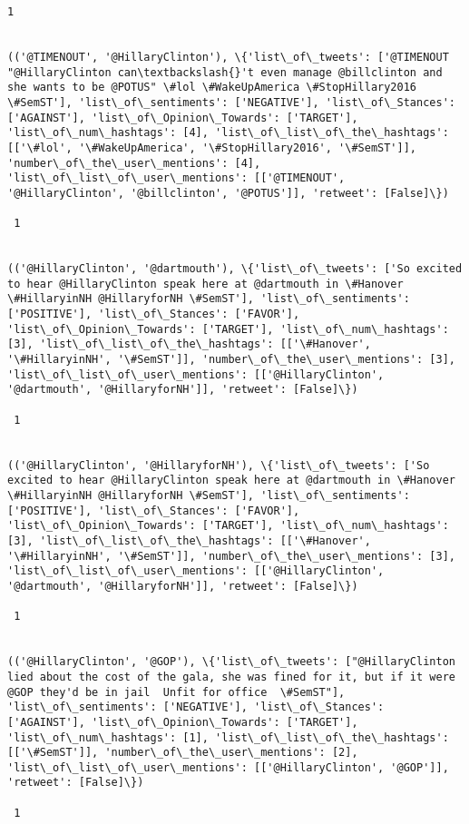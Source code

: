\documentclass[11pt]{article}
\begin{document}
\begin{Verbatim}[commandchars=\\\{\}]
 1
 

(('@TIMENOUT', '@HillaryClinton'), \{'list\_of\_tweets': ['@TIMENOUT  "@HillaryClinton can\textbackslash{}'t even manage @billclinton and she wants to be @POTUS" \#lol \#WakeUpAmerica \#StopHillary2016 \#SemST'], 'list\_of\_sentiments': ['NEGATIVE'], 'list\_of\_Stances': ['AGAINST'], 'list\_of\_Opinion\_Towards': ['TARGET'], 'list\_of\_num\_hashtags': [4], 'list\_of\_list\_of\_the\_hashtags': [['\#lol', '\#WakeUpAmerica', '\#StopHillary2016', '\#SemST']], 'number\_of\_the\_user\_mentions': [4], 'list\_of\_list\_of\_user\_mentions': [['@TIMENOUT', '@HillaryClinton', '@billclinton', '@POTUS']], 'retweet': [False]\})

 1
 

(('@HillaryClinton', '@dartmouth'), \{'list\_of\_tweets': ['So excited to hear @HillaryClinton speak here at @dartmouth in \#Hanover \#HillaryinNH @HillaryforNH \#SemST'], 'list\_of\_sentiments': ['POSITIVE'], 'list\_of\_Stances': ['FAVOR'], 'list\_of\_Opinion\_Towards': ['TARGET'], 'list\_of\_num\_hashtags': [3], 'list\_of\_list\_of\_the\_hashtags': [['\#Hanover', '\#HillaryinNH', '\#SemST']], 'number\_of\_the\_user\_mentions': [3], 'list\_of\_list\_of\_user\_mentions': [['@HillaryClinton', '@dartmouth', '@HillaryforNH']], 'retweet': [False]\})

 1
 

(('@HillaryClinton', '@HillaryforNH'), \{'list\_of\_tweets': ['So excited to hear @HillaryClinton speak here at @dartmouth in \#Hanover \#HillaryinNH @HillaryforNH \#SemST'], 'list\_of\_sentiments': ['POSITIVE'], 'list\_of\_Stances': ['FAVOR'], 'list\_of\_Opinion\_Towards': ['TARGET'], 'list\_of\_num\_hashtags': [3], 'list\_of\_list\_of\_the\_hashtags': [['\#Hanover', '\#HillaryinNH', '\#SemST']], 'number\_of\_the\_user\_mentions': [3], 'list\_of\_list\_of\_user\_mentions': [['@HillaryClinton', '@dartmouth', '@HillaryforNH']], 'retweet': [False]\})

 1
 

(('@HillaryClinton', '@GOP'), \{'list\_of\_tweets': ["@HillaryClinton lied about the cost of the gala, she was fined for it, but if it were @GOP they'd be in jail  Unfit for office  \#SemST"], 'list\_of\_sentiments': ['NEGATIVE'], 'list\_of\_Stances': ['AGAINST'], 'list\_of\_Opinion\_Towards': ['TARGET'], 'list\_of\_num\_hashtags': [1], 'list\_of\_list\_of\_the\_hashtags': [['\#SemST']], 'number\_of\_the\_user\_mentions': [2], 'list\_of\_list\_of\_user\_mentions': [['@HillaryClinton', '@GOP']], 'retweet': [False]\})

 1
 


\end{Verbatim}
\end{document}

